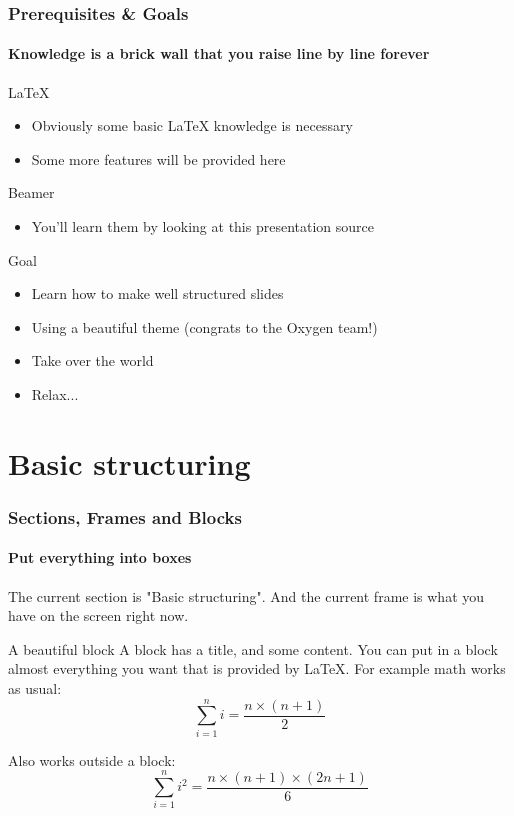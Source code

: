 \documentclass[12pt]{beamer}
\begin{document}
\begin{frame}
  \frametitle{Prerequisites \& Goals}
  \framesubtitle{Knowledge is a brick wall that you raise line by line forever}
  \begin{block}{LaTeX}
  \begin{itemize}
    \item Obviously some basic LaTeX knowledge is necessary
    \item Some more features will be provided here
  \end{itemize}
  \end{block}

  \begin{block}{Beamer}
  \begin{itemize}
    \item You'll learn them by looking at this presentation source
  \end{itemize}
  \end{block}

  \begin{block}{Goal}
  \begin{itemize}
    \item Learn how to make well structured slides
    \item Using a beautiful theme (congrats to the Oxygen team!)
    \item Take over the world
    \item Relax...
  \end{itemize}
  \end{block}
\end{frame}

\section{Basic structuring}
\begin{frame}
  \frametitle{Sections, Frames and Blocks}
  \framesubtitle{Put everything into boxes}

  The current section is "Basic structuring". And the current frame
  is what you have on the screen right now.

  \begin{block}{A beautiful block}
  A block has a title, and some content. You can put in a block
  almost everything you want that is provided by LaTeX. For example
  math works as usual:
    \begin{equation}
    \sum_{i=1}^n i = \frac{n \times (n+1)}{2}
    \end{equation}
  \end{block}

  Also works outside a block:
  \begin{equation}
  \sum_{i=1}^n i^2 = \frac{n \times (n+1) \times (2n+1)}{6}
  \end{equation}
\end{frame}
\end{document}
